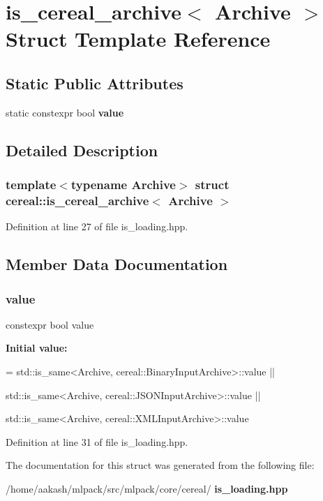 \section{is\+\_\+cereal\+\_\+archive$<$ Archive $>$ Struct Template Reference}
\label{structcereal_1_1is__cereal__archive}
\subsection*{Static Public Attributes}
\begin{DoxyCompactItemize}
\item 
static constexpr bool \textbf{ value}
\end{DoxyCompactItemize}


\subsection{Detailed Description}
\subsubsection*{template$<$typename Archive$>$\newline
struct cereal\+::is\+\_\+cereal\+\_\+archive$<$ Archive $>$}



Definition at line 27 of file is\+\_\+loading.\+hpp.



\subsection{Member Data Documentation}
\mbox{\label{structcereal_1_1is__cereal__archive_a5b4ee4ae6cba6bb75200ba7af1910873}} 
\subsubsection{value}
{\footnotesize\ttfamily constexpr bool value\hspace{0.3cm}{\ttfamily [static]}}

{\bfseries Initial value\+:}
\begin{DoxyCode}
= std::is\_same<Archive,
      cereal::BinaryInputArchive>::value ||

      std::is\_same<Archive, cereal::JSONInputArchive>::value ||

      std::is\_same<Archive, cereal::XMLInputArchive>::value
\end{DoxyCode}


Definition at line 31 of file is\+\_\+loading.\+hpp.



The documentation for this struct was generated from the following file\+:\begin{DoxyCompactItemize}
\item 
/home/aakash/mlpack/src/mlpack/core/cereal/\textbf{ is\+\_\+loading.\+hpp}\end{DoxyCompactItemize}
